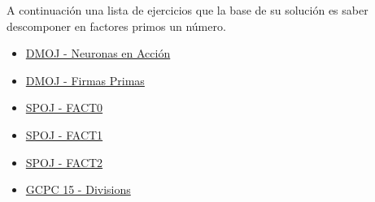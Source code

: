 A continuación una lista de ejercicios que la base de su solución es saber descomponer en
factores primos un número.

\begin{itemize}
	\item \href{https://dmoj.uclv.edu.cu/problem/brain}{DMOJ - Neuronas en Acción}
	\item \href{https://dmoj.uclv.edu.cu/problem/firmaprime}{DMOJ - Firmas Primas}
	\item \href{https://www.spoj.com/problems/FACT0/}{SPOJ - FACT0}
	\item \href{https://www.spoj.com/problems/FACT1/}{SPOJ - FACT1}
	\item \href{https://www.spoj.com/problems/FACT2/}{SPOJ - FACT2}
	\item \href{https://codeforces.com/gym/100753}{GCPC 15 - Divisions}
\end{itemize}